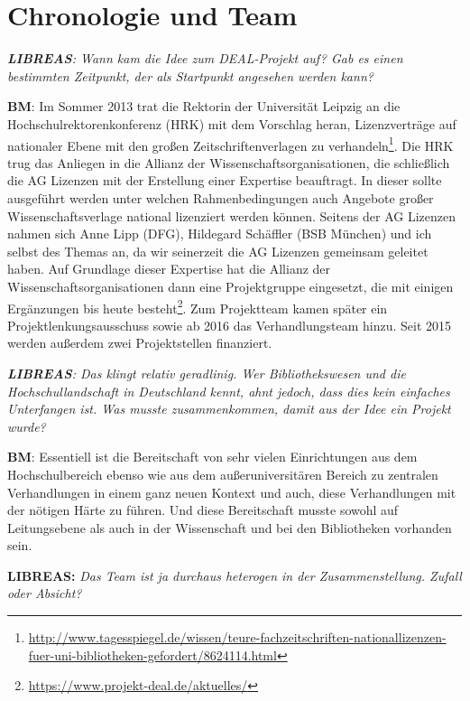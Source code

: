 \documentclass[a4paper,
fontsize=11pt,
oneside,
numbers=noperiodatend,
parskip=half-,
bibliography=totoc,
final
]{scrartcl}
\begin{document}
\hypertarget{chronologie-und-team}{%
\section*{Chronologie und Team}\label{chronologie-und-team}}

\emph{\textbf{LIBREAS}: Wann kam die Idee zum DEAL-Projekt auf? Gab es
einen bestimmten Zeitpunkt, der als Startpunkt angesehen werden kann?}

\textbf{BM}: Im Sommer 2013 trat die Rektorin der Universität Leipzig an
die Hochschulrektorenkonferenz (HRK) mit dem Vorschlag heran,
Lizenzverträge auf nationaler Ebene mit den großen Zeitschriftenverlagen
zu verhandeln\footnote{\url{http://www.tagesspiegel.de/wissen/teure-fachzeitschriften-nationallizenzen-fuer-uni-bibliotheken-gefordert/8624114.html}}.
Die HRK trug das Anliegen in die Allianz der
Wissenschaftsorganisationen, die schließlich die AG Lizenzen mit der
Erstellung einer Expertise beauftragt. In dieser sollte ausgeführt
werden unter welchen Rahmenbedingungen auch Angebote großer
Wissenschaftsverlage national lizenziert werden können. Seitens der AG
Lizenzen nahmen sich Anne Lipp (DFG), Hildegard Schäffler (BSB München)
und ich selbst des Themas an, da wir seinerzeit die AG Lizenzen
gemeinsam geleitet haben. Auf Grundlage dieser Expertise hat die Allianz
der Wissenschaftsorganisationen dann eine Projektgruppe eingesetzt, die
mit einigen Ergänzungen bis heute besteht\footnote{\url{https://www.projekt-deal.de/aktuelles/}}.
Zum Projektteam kamen später ein Projektlenkungsausschuss sowie ab 2016
das Verhandlungsteam hinzu. Seit 2015 werden außerdem zwei
Projektstellen finanziert.

\emph{\textbf{LIBREAS}: Das klingt relativ geradlinig. Wer
Bibliothekswesen und die Hochschullandschaft in Deutschland kennt, ahnt
jedoch, dass dies kein einfaches Unterfangen ist. Was musste
zusammenkommen, damit aus der Idee ein Projekt wurde?}

\textbf{BM}: Essentiell ist die Bereitschaft von sehr vielen
Einrichtungen aus dem Hochschulbereich ebenso wie aus dem
außeruniversitären Bereich zu zentralen Verhandlungen in einem ganz
neuen Kontext und auch, diese Verhandlungen mit der nötigen Härte zu
führen. Und diese Bereitschaft musste sowohl auf Leitungsebene als auch
in der Wissenschaft und bei den Bibliotheken vorhanden sein.

\textbf{LIBREAS:} \emph{Das Team ist ja durchaus heterogen in der
Zusammenstellung. Zufall oder Absicht?}
\end{document}
